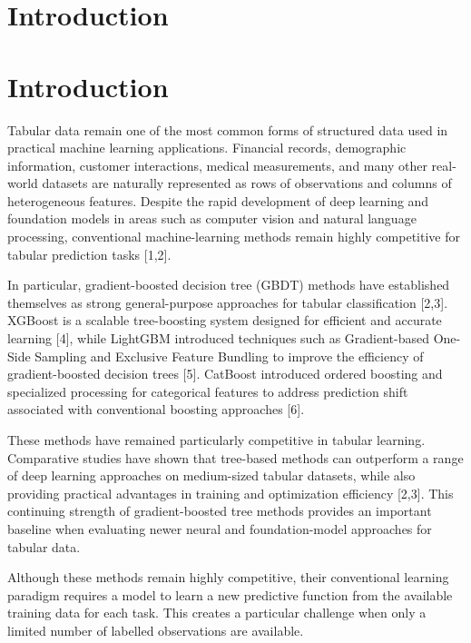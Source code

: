 \section{Introduction}\label{introduction}

\section{Introduction}\label{introduction-1}

Tabular data remain one of the most common forms of structured data used in practical machine learning applications. Financial records, demographic information, customer interactions, medical measurements, and many other real-world datasets are naturally represented as rows of observations and columns of heterogeneous features. Despite the rapid development of deep learning and foundation models in areas such as computer vision and natural language processing, conventional machine-learning methods remain highly competitive for tabular prediction tasks {[}1,2{]}.

In particular, gradient-boosted decision tree (GBDT) methods have established themselves as strong general-purpose approaches for tabular classification {[}2,3{]}. XGBoost is a scalable tree-boosting system designed for efficient and accurate learning {[}4{]}, while LightGBM introduced techniques such as Gradient-based One-Side Sampling and Exclusive Feature Bundling to improve the efficiency of gradient-boosted decision trees {[}5{]}. CatBoost introduced ordered boosting and specialized processing for categorical features to address prediction shift associated with conventional boosting approaches {[}6{]}.

These methods have remained particularly competitive in tabular learning. Comparative studies have shown that tree-based methods can outperform a range of deep learning approaches on medium-sized tabular datasets, while also providing practical advantages in training and optimization efficiency {[}2,3{]}. This continuing strength of gradient-boosted tree methods provides an important baseline when evaluating newer neural and foundation-model approaches for tabular data.

Although these methods remain highly competitive, their conventional learning paradigm requires a model to learn a new predictive function from the available training data for each task. This creates a particular challenge when only a limited number of labelled observations are available.

